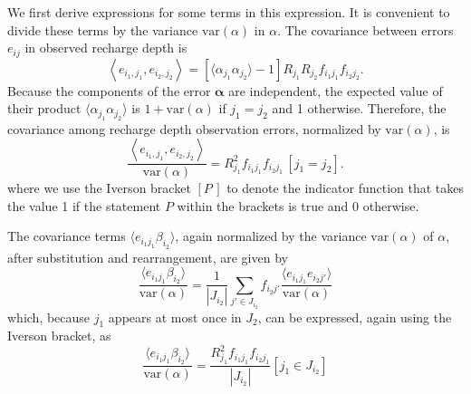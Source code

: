 \documentclass[11pt,a4paper]{article}
\begin{document}
We first derive expressions for some terms in this expression.  It is
convenient to divide these terms by the variance $\text{var}(\alpha)$
in $\alpha$.  The covariance between errors $e_{ij}$ in observed
recharge depth is
\begin{equation}
  \left\langle e_{i_1, j_1},e_{i_2, j_2}\right\rangle = \left[ \langle\alpha_{j_1} \alpha_{j_2}\rangle - 1 \right] R_{j_1} R_{j_2} f_{i_1 j_1} f_{i_2 j_2}.
\end{equation}
Because the components of the error $\bm{\alpha}$ are independent,
the expected value of their product
$\langle\alpha_{j_1} \alpha_{j_2}\rangle$ is $1 + \text{var}(\alpha)$
if $j_1 = j_2$ and 1 otherwise.  Therefore, the covariance among
recharge depth observation errors, normalized by $\text{var}(\alpha)$,
is
\begin{equation}
  \label{eq:e_covariance}
  \frac{\left\langle e_{i_1, j_1}, e_{i_2, j_2}\right\rangle}
       {\text{var}(\alpha)} =
    R_{j_1}^2 f_{i_1 j_1} f_{i_2 j_1}\, [j_1 = j_2].
\end{equation}
where we use the Iverson bracket $[P\,]$ to denote the indicator
function that takes the value 1 if the statement $P$ within the
brackets is true and 0 otherwise.

The covariance terms $\langle e_{i_1 j_1} \beta_{i_2}\rangle$, again
normalized by the variance $\text{var}(\alpha)$ of $\alpha$, after
substitution and rearrangement, are given by
\begin{equation}
  \frac{\langle e_{i_1 j_1} \beta_{i_2}\rangle}{\text{var}(\alpha)} = \frac{1}{|J_{i_2}|}\sum_{j' \in J_{i_2}} f_{i_2 j'} \frac{\langle e_{i_1 j_1} e_{i_2 j'} \rangle}{\text{var}(\alpha)}
\end{equation}
which, because $j_1$ appears at most once in $J_2$, can be expressed,
again using the Iverson bracket, as
\begin{equation}
  \label{eq:e_beta_covariance}
  \frac{\langle e_{i_1 j_1} \beta_{i_2}\rangle}{\text{var}(\alpha)} = \frac{R_{j_1}^2 f_{i_1 j_1} f_{i_2 j_1}}{|J_{i_2}|} [j_1 \in J_{i_2}]
\end{equation}
\end{document}
